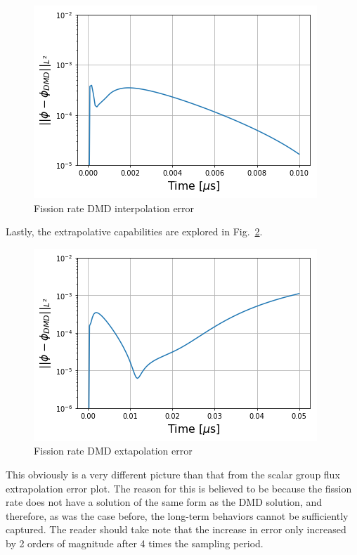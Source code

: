 \documentclass[12pt]{article}
\newcommand{\LFI}[1]{\label{fi:#1}}
\newcommand{\FI}[1]{Fig.~\ref{fi:#1}}
\newcommand{\bfg}{\begin{figure}}
\newcommand{\efg}{\end{figure}}
\begin{document}
%
\bfg[!htb] \centering
	\includegraphics[scale=0.5]{fission_interp_error.png}
	\caption{Fission rate DMD interpolation error}
	\LFI{interp-fis}
\efg

Lastly, the extrapolative capabilities are explored in \FI{extrap-fis}. 
%
\bfg[t] \centering
	\includegraphics[scale=0.5]{fission_extrap_error.png}
	\caption{Fission rate DMD extapolation error}
	\LFI{extrap-fis}
\efg
This obviously is a very different picture than that from the scalar group flux
	extrapolation error plot.
The reason for this is believed to be because the fission rate does not have 
	a solution of the same form as the DMD solution, and therefore, as was the
	case before, the long-term behaviors cannot be sufficiently captured.
The reader should take note that the increase in error only increased by 2
	orders of magnitude after 4 times the sampling period.
\end{document}
